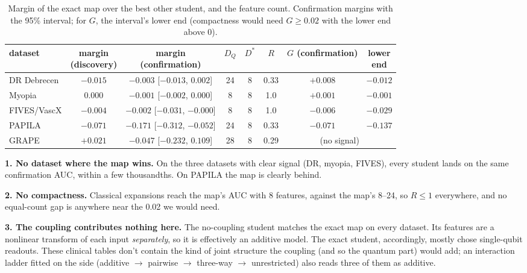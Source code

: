 \documentclass[11pt]{article}
\begin{document}
\begin{table}[H]\centering\small
\caption{Margin of the exact map over the best other student, and the feature count. Confirmation margins
with the 95\% interval; for $G$, the interval's lower end (compactness would need $G\ge0.02$ with the lower
end above 0).}\label{tab:count}
\footnotesize\setlength{\tabcolsep}{3.5pt}
\begin{tabular}{@{}lccccccc@{}}\toprule
dataset & \shortstack{margin\\(discovery)} & \shortstack{margin\\(confirmation)} & $D_Q$ & $D^\ast$ & $R$ & \shortstack{$G$\\(confirmation)} & \shortstack{lower\\end}\\\midrule
DR Debrecen & $-0.015$ & $-0.003$ [$-0.013$, $0.002$] & 24 & 8 & 0.33 & $+0.008$ & $-0.012$\\
Myopia      & $0.000$ & $-0.001$ [$-0.002$, $0.000$] & 8  & 8 & 1.0  & $+0.001$ & $-0.001$\\
FIVES/VascX & $-0.004$ & $-0.002$ [$-0.031$, $-0.000$] & 8  & 8 & 1.0  & $-0.006$ & $-0.029$\\
PAPILA      & $-0.071$ & $-0.171$ [$-0.312$, $-0.052$] & 24 & 8 & 0.33 & $-0.071$ & $-0.137$\\
GRAPE       & $+0.021$ & $-0.047$ [$-0.232$, $0.109$] & 28 & 8 & 0.29 & \multicolumn{2}{c}{(no signal)}\\\bottomrule
\end{tabular}
\end{table}

\textbf{1. No dataset where the map wins.} On the three datasets with clear signal (DR, myopia, FIVES), every
student lands on the same confirmation AUC, within a few thousandths. On PAPILA the map is clearly behind.

\textbf{2. No compactness.} Classical expansions reach the map's AUC with 8 features, against the map's 8--24,
so $R\le1$ everywhere, and no equal-count gap is anywhere near the 0.02 we would need.

\textbf{3. The coupling contributes nothing here.} The no-coupling student matches the exact map on every
dataset. Its features are a nonlinear transform of each input \emph{separately}, so it is effectively an
additive model. The exact student, accordingly, mostly chose single-qubit readouts. These clinical tables
don't contain the kind of joint structure the coupling (and so the quantum part) would add; an interaction
ladder fitted on the side (additive $\to$ pairwise $\to$ three-way $\to$ unrestricted) also reads three of
them as additive.
\end{document}
